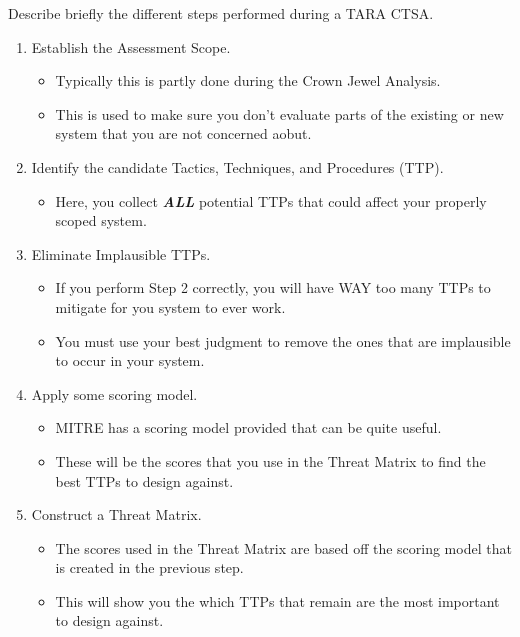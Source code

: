 \begin{questions}
\question{} Describe briefly the different steps performed during a TARA CTSA.\@
  \begin{solution}
    \begin{enumerate}[noitemsep]
    \item Establish the Assessment Scope.
      \begin{itemize}[noitemsep]
      \item Typically this is partly done during the Crown Jewel Analysis.
      \item This is used to make sure you don't evaluate parts of the existing or new system that you are not concerned aobut.
      \end{itemize}
    \item Identify the candidate Tactics, Techniques, and Procedures (TTP).
      \begin{itemize}[noitemsep]
      \item Here, you collect \emph{\textbf{ALL}} potential TTPs that could affect your properly scoped system.
      \end{itemize}
    \item Eliminate Implausible TTPs.
      \begin{itemize}[noitemsep]
      \item If you perform Step 2 correctly, you will have WAY too many TTPs to mitigate for you system to ever work.
      \item You must use your best judgment to remove the ones that are implausible to occur in your system.
      \end{itemize}
    \item Apply some scoring model.
      \begin{itemize}[noitemsep]
      \item MITRE has a scoring model provided that can be quite useful.
      \item These will be the scores that you use in the Threat Matrix to find the best TTPs to design against.
      \end{itemize}
    \item Construct a Threat Matrix.
      \begin{itemize}[noitemsep]
      \item The scores used in the Threat Matrix are based off the scoring model that is created in the previous step.
      \item This will show you the which TTPs that remain are the most important to design against.
      \end{itemize}
    \end{enumerate}
  \end{solution}


\end{questions}
